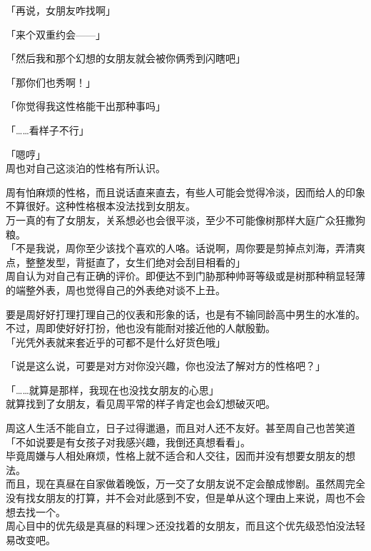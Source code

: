 「再说，女朋友咋找啊」

「来个双重约会——」

「然后我和那个幻想的女朋友就会被你俩秀到闪瞎吧」

「那你们也秀啊！」

「你觉得我这性格能干出那种事吗」

「……看样子不行」

「嗯哼」\\

周也对自己这淡泊的性格有所认识。

周有怕麻烦的性格，而且说话直来直去，有些人可能会觉得冷淡，因而给人的印象不算很好。这种性格根本没法找到女朋友。\\

万一真的有了女朋友，关系想必也会很平淡，至少不可能像树那样大庭广众狂撒狗粮。\\

「不是我说，周你至少该找个喜欢的人咯。话说啊，周你要是剪掉点刘海，弄清爽点，整整发型，背挺直了，女生们绝对会刮目相看的」\\

周自认为对自己有正确的评价。即便达不到门胁那种帅哥等级或是树那种稍显轻薄的端整外表，周也觉得自己的外表绝对谈不上丑。

要是周好好打理打理自己的仪表和形象的话，也是有不输同龄高中男生的水准的。\\

不过，周即使好好打扮，他也没有能耐对接近他的人献殷勤。\\

「光凭外表就来套近乎的可都不是什么好货色哦」

「说是这么说，可要是对方对你没兴趣，你也没法了解对方的性格吧？」

「……就算是那样，我现在也没找女朋友的心思」\\

就算找到了女朋友，看见周平常的样子肯定也会幻想破灭吧。

周这人生活不能自立，日子过得邋遢，而且对人还不友好。甚至周自己也苦笑道「不如说要是有女孩子对我感兴趣，我倒还真想看看」。\\

毕竟周嫌与人相处麻烦，性格上就不适合和人交往，因而并没有想要女朋友的想法。\\

而且，现在真昼在自家做着晚饭，万一交了女朋友说不定会酿成惨剧。虽然周完全没有找女朋友的打算，并不会对此感到不安，但是单从这个理由上来说，周也不会想去找一个。\\

周心目中的优先级是真昼的料理＞还没找着的女朋友，而且这个优先级恐怕没法轻易改变吧。\\

